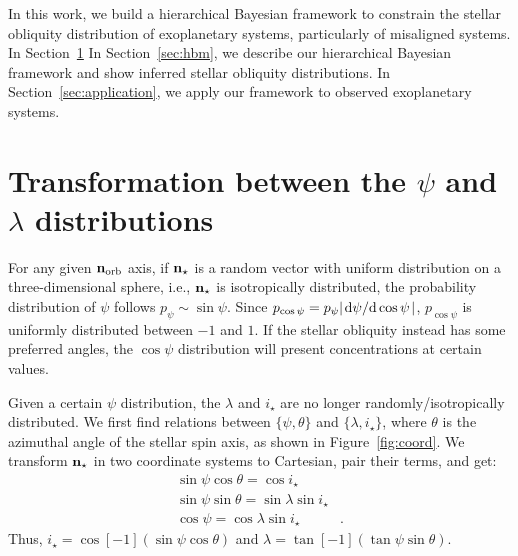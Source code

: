 \documentclass[twocolumn,times]{aastex631}
\begin{document}
In this work, we build a hierarchical Bayesian framework to constrain the stellar obliquity distribution of exoplanetary systems, particularly of misaligned systems.
In Section~\ref{sec:jacobian}
In Section~\ref{sec:hbm}, we describe our hierarchical Bayesian framework and show inferred stellar obliquity distributions. 
In Section~\ref{sec:application}, we apply our framework to observed exoplanetary systems.

\section{Transformation between the $\psi$ and $\lambda$ distributions}\label{sec:jacobian}

For any given $\bf{n}_{\rm orb}$ axis, if $\bf{n}_{\star}$ is a random vector with uniform distribution on a three-dimensional sphere, i.e., $\bf{n}_{\star}$ is isotropically distributed, the probability distribution of $\psi$ follows $p_{\psi} \sim \sin{\psi}$. Since $p_{\cos{\psi}} = p_{\psi} \abs{\dv*{\psi}{\cos{\psi}}}$, $p_{\cos{\psi}}$ is uniformly distributed between $-1$ and $1$. If the stellar obliquity instead has some preferred angles, the $\cos{\psi}$ distribution will present concentrations at certain values.

Given a certain $\psi$ distribution, the $\lambda$ and $i_\star$ are no longer randomly/isotropically distributed. We first find relations between $\{\psi, \theta\}$ and $\{\lambda, i_\star\}$, where $\theta$ is the azimuthal angle of the stellar spin axis, as shown in Figure~\ref{fig:coord}. We transform $\bf{n}_{\star}$ in two coordinate systems to Cartesian, pair their terms, and get:
\begin{align}
    \sin{\psi}\cos{\theta} = \cos{i_\star}& \label{eq:coord1}\\
    \sin{\psi}\sin{\theta} = \sin{\lambda}\sin{i_\star}& \label{eq:coord2}\\
    \cos{\psi} = \cos{\lambda}\sin{i_\star} \label{eq:coord3}&.
\end{align}
Thus, $i_\star = \cos[-1](\sin{\psi}\cos{\theta})$ and $\lambda = \tan[-1](\tan{\psi}\sin{\theta})$. 
\end{document}
